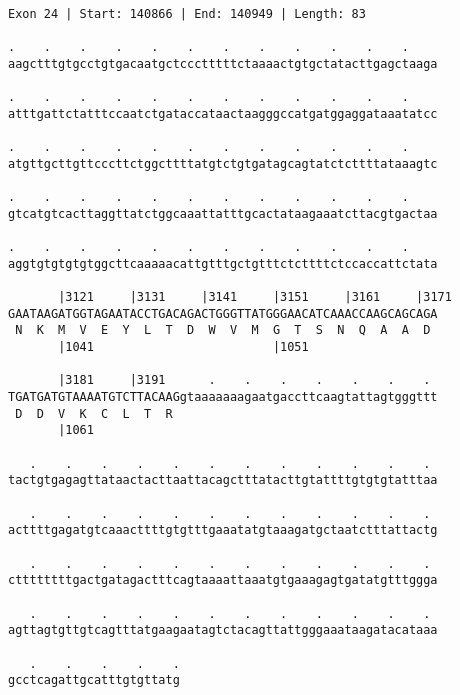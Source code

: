 \documentclass{article}
\begin{document}
\begin{Verbatim}
Exon 24 | Start: 140866 | End: 140949 | Length: 83
 
.    .    .    .    .    .    .    .    .    .    .    .    
aagctttgtgcctgtgacaatgctccctttttctaaaactgtgctatacttgagctaaga
  
.    .    .    .    .    .    .    .    .    .    .    .    
atttgattctatttccaatctgataccataactaagggccatgatggaggataaatatcc
  
.    .    .    .    .    .    .    .    .    .    .    .    
atgttgcttgttcccttctggcttttatgtctgtgatagcagtatctcttttataaagtc
  
.    .    .    .    .    .    .    .    .    .    .    .    
gtcatgtcacttaggttatctggcaaattatttgcactataagaaatcttacgtgactaa
  
.    .    .    .    .    .    .    .    .    .    .    .    
aggtgtgtgtgtggcttcaaaaacattgtttgctgtttctcttttctccaccattctata
  
       |3121     |3131     |3141     |3151     |3161     |3171
GAATAAGATGGTAGAATACCTGACAGACTGGGTTATGGGAACATCAAACCAAGCAGCAGA
 N  K  M  V  E  Y  L  T  D  W  V  M  G  T  S  N  Q  A  A  D 
       |1041                         |1051                  
  
       |3181     |3191      .    .    .    .    .    .    . 
TGATGATGTAAAATGTCTTACAAGgtaaaaaaagaatgaccttcaagtattagtgggttt
 D  D  V  K  C  L  T  R                                     
       |1061                                                
  
   .    .    .    .    .    .    .    .    .    .    .    . 
tactgtgagagttataactacttaattacagctttatacttgtattttgtgtgtatttaa
  
   .    .    .    .    .    .    .    .    .    .    .    . 
acttttgagatgtcaaacttttgtgtttgaaatatgtaaagatgctaatctttattactg
  
   .    .    .    .    .    .    .    .    .    .    .    . 
cttttttttgactgatagactttcagtaaaattaaatgtgaaagagtgatatgtttggga
  
   .    .    .    .    .    .    .    .    .    .    .    . 
agttagtgttgtcagtttatgaagaatagtctacagttattgggaaataagatacataaa
  
   .    .    .    .    .
gcctcagattgcatttgtgttatg
\end{Verbatim}
\newpage
\end{document}

